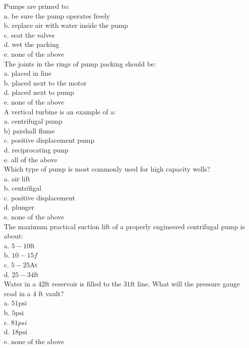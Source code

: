 Pumps are primed to:\\
a. be sure the pump operates freely\\
b. replace air with water inside the pump\\
c. seat the valves\\
d. wet the packing\\
e. none of the above\\

The joints in the rings of pump packing should be:\\
a. placed in line\\
b. placed next to the motor\\
d. placed next to pump\\
e. none of the above\\

A vertical turbine is an example of a:\\
a. centrifugal pump\\
b) parshall flume\\
c. positive displacement pump\\
d. reciprocating punp\\
e. all of the above\\

Which type of pump is most commonly used for high capacity wells?\\
a. air lift\\
b. centrifigal\\
c. positive displacement\\
d. plunger\\
e. none of the above\\

The maximum practical suction lift of a properly engineered centrifugal pump is about:\\
a. $5-10 \mathrm{ft}$\\
b. $10-15 f$\\
c. $5-25 \mathrm{At}$\\
d. $25-34 \mathrm{ft}$\\

Water in a $42 \mathrm{ft}$ reservoir is filled to the $31 \mathrm{ft}$ line. What will the pressure gauge read in a 4 ft vault?\\
a. $51 \mathrm{psi}$\\
b. $5 \mathrm{psi}$\\
c. $81 p s i$\\
d. $18 \mathrm{psi}$\\
e. none of the above\\

